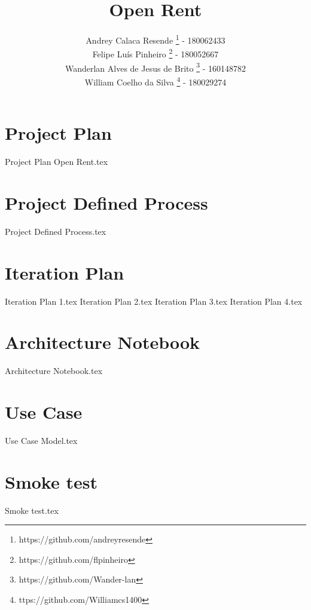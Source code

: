 \documentclass[a4paper,11pt]{book}
\title{Open Rent}
\author{
    Andrey Calaca Resende \footnote{https://github.com/andreyresende} - 180062433\\
    Felipe Luís Pinheiro \footnote{https://github.com/flpinheiro} - 180052667 \\
    Wanderlan Alves de Jesus de Brito \footnote{https://github.com/Wander-lan} - 160148782\\
    William Coelho da Silva \footnote{ttps://github.com/Williamcs1400} - 180029274

}
\date{}
\begin{document}
\maketitle

\tableofcontents

\chapter{Project Plan}
{Project Plan Open Rent.tex}

\chapter{Project Defined Process}
{Project Defined Process.tex}

\chapter{Iteration Plan}
{Iteration Plan 1.tex}
{Iteration Plan 2.tex}
{Iteration Plan 3.tex}
{Iteration Plan 4.tex}

\chapter{Architecture Notebook}
{Architecture Notebook.tex}

\chapter{Use Case}
{Use Case Model.tex}

\chapter{Smoke test}
{Smoke test.tex}

\printglossary
\end{document}
